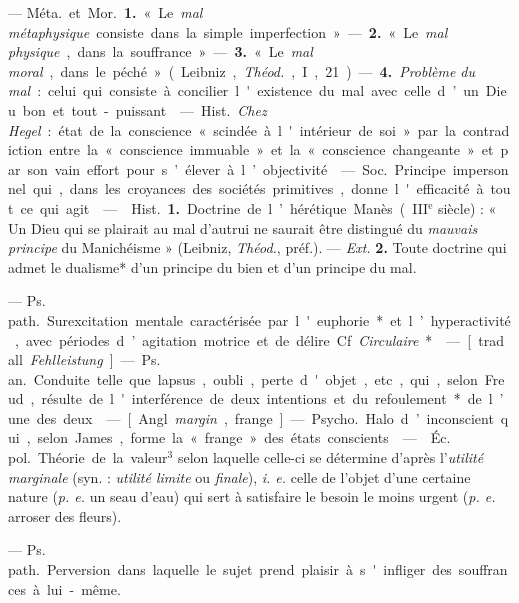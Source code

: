 \begin{itemize}[leftmargin=1cm, label=, itemsep=1pt]
 — \si{Méta.} et \si{Mor.} {\bf 1.} « Le {\it mal métaphysique}
consiste dans la simple imperfection ». — {\bf 2.} « Le {\it mal physique},
dans la souffrance ». — {\bf 3.} « Le {\it mal moral}, dans le
péché » (Leibniz, {\it Théod.}, I, 21). — {\bf 4.} {\it Problème du mal} :
celui qui consiste à concilier l'existence du mal avec celle d’un Dieu bon et
tout-puissant.

 — \si{Hist.} {\it Chez Hegel} : état de la
conscience « scindée à l'intérieur de soi » par la contradiction entre la
« conscience immuable » et la « conscience changeante » et par son vain
effort pour s’élever à l’objectivité.

 — \si{Soc.} Principe impersonnel qui, dans les croyances des
sociétés primitives, donne l'efficacité à tout ce qui agit.

 —  \si{Hist.} {\bf 1.} Doctrine de
l’hérétique Manès ({\footnotesize III}$^\text{e}$ siècle) : « Un Dieu qui se
plairait au mal d'autrui ne saurait être distingué du {\it mauvais principe}
du Manichéisme » (Leibniz, {\it Théod.}, préf.). — {\it Ext.} {\bf 2.} Toute
doctrine qui admet le dualisme* d’un principe du bien et d’un principe du mal.

 — \si{Ps. path.} Surexcitation mentale caractérisée par
l'euphorie* et l’hyperactivité, avec périodes
d’agitation motrice et de délire. Cf. {\it Circulaire}*.

 — [trad. all. {\it Fehlleistung}] — \si{Ps. an.} Conduite
telle que lapsus, oubli, perte d'objet, etc., qui, selon Freud, résulte de
l'interférence de deux intentions et du refoulement* de l’une des deux.

 — [Angl. {\it margin}, frange] — \si{Psycho.} Halo
d’inconscient qui, selon James, forme la « frange » des états conscients.

 —  \si{Éc. pol.} Théorie de la valeur$^3$
selon laquelle celle-ci se détermine d’après l'{\it utilité marginale}
(syn. : {\it utilité limite} ou {\it finale}), {\it i. e.} celle de l’objet
d'une certaine nature ({\it p. e.} un seau d’eau) qui sert à satisfaire le
besoin le moins urgent ({\it p. e.} arroser des fleurs).

 — \si{Ps. path.} Perversion dans laquelle le sujet prend
plaisir à s'infliger des souffrances à lui-même.


\end{itemize}
